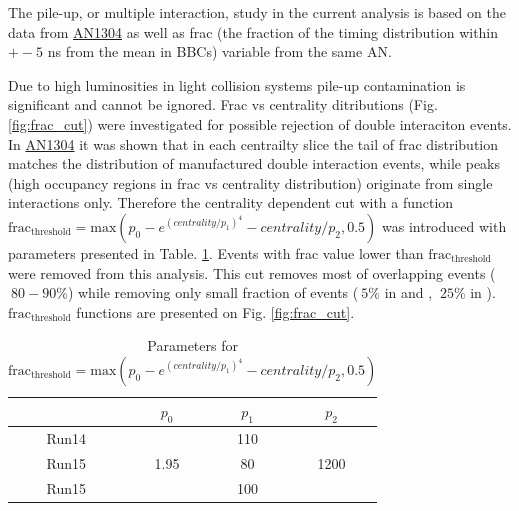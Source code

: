 The pile-up, or multiple interaction, study in the current analysis is based on the data from \href{https://phenix-intra.sdcc.bnl.gov/phenix/WWW/p/draft/dcm07e/DoubleInteractionAN/small-system-double.pdf}{AN1304} as well as frac (the fraction of the timing distribution within $+-5$ ns from the mean in BBCs) variable from the same AN. 

Due to high luminosities in light collision systems pile-up contamination is significant and cannot be ignored. Frac vs centrality ditributions (Fig. \ref{fig:frac_cut}) were investigated for possible rejection of double interaciton events. 
In \href{https://phenix-intra.sdcc.bnl.gov/phenix/WWW/p/draft/dcm07e/DoubleInteractionAN/small-system-double.pdf}{AN1304} it was shown that in each centrailty slice the tail of frac distribution matches the distribution of manufactured double interaction events, while peaks (high occupancy regions in frac vs centrality distribution) originate from single interactions only.
Therefore the centrality dependent cut with a function $\text{frac}_{\text{threshold}} = \text{max}(p_0 - e^{(centrality/p_1)^4} - centrality/p_2, 0.5)$ was introduced with parameters presented in Table. \ref{table:frac_cut_par}. 
Events with frac value lower than $\text{frac}_{\text{threshold}}$ were removed from this analysis. 
This cut removes most of overlapping events ($~80-90\%$) while removing only small fraction of events ($~5\%$ in \HeAu and \pAu, $~25\%$ in \pAl). 
$\text{frac}_{\text{threshold}}$ functions are presented on Fig. \ref{fig:frac_cut}.

\begin{table}[h!]
	\centering
	\begin{tabular}{c||c|c|c}
		 & $p_0$ & $p_1$ & $p_2$ \\
		\hline
		\hline
		Run14 \HeAu & & 110 & \\
		Run15 \pAl & 1.95 & 80 & 1200 \\
		Run15 \pAu & & 100 & \\
	\end{tabular}
   \caption[Parameters for frac cut]{Parameters for $\text{frac}_{\text{threshold}} = \text{max}(p_0 - e^{(centrality/p_1)^4} - centrality/p_2, 0.5)$}
	\label{table:frac_cut_par}
\end{table}

